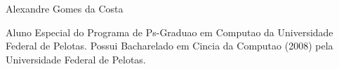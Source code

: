 \documentclass[12pt,a4paper,compsoc]{IEEEtran}
\begin{document}
\begin{IEEEbiography}{Alexandre Gomes da Costa}

  Aluno Especial do Programa de Ps-Graduao em Computao da Universidade Federal de Pelotas. Possui
  Bacharelado em Cincia da Computao (2008) pela Universidade Federal de Pelotas.
  
\end{IEEEbiography}
\end{document}
